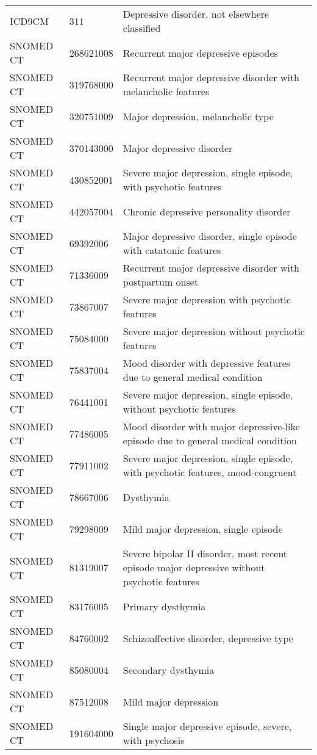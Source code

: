 \begin{longtable}{p{}p{}p{}}
  ICD9CM & 311 & Depressive disorder, not elsewhere classified \\ 
  SNOMED CT & 268621008 & Recurrent major depressive episodes \\ 
  SNOMED CT & 319768000 & Recurrent major depressive disorder with melancholic features \\ 
  SNOMED CT & 320751009 & Major depression, melancholic type \\ 
  SNOMED CT & 370143000 & Major depressive disorder \\ 
  SNOMED CT & 430852001 & Severe major depression, single episode, with psychotic features \\ 
  SNOMED CT & 442057004 & Chronic depressive personality disorder \\ 
  SNOMED CT & 69392006 & Major depressive disorder, single episode with catatonic features \\ 
  SNOMED CT & 71336009 & Recurrent major depressive disorder with postpartum onset \\ 
  SNOMED CT & 73867007 & Severe major depression with psychotic features \\ 
  SNOMED CT & 75084000 & Severe major depression without psychotic features \\ 
  SNOMED CT & 75837004 & Mood disorder with depressive features due to general medical condition \\ 
  SNOMED CT & 76441001 & Severe major depression, single episode, without psychotic features \\ 
  SNOMED CT & 77486005 & Mood disorder with major depressive-like episode due to general medical condition \\ 
  SNOMED CT & 77911002 & Severe major depression, single episode, with psychotic features, mood-congruent \\ 
  SNOMED CT & 78667006 & Dysthymia \\ 
  SNOMED CT & 79298009 & Mild major depression, single episode \\ 
  SNOMED CT & 81319007 & Severe bipolar II disorder, most recent episode major depressive without psychotic features \\ 
  SNOMED CT & 83176005 & Primary dysthymia \\ 
  SNOMED CT & 84760002 & Schizoaffective disorder, depressive type \\ 
  SNOMED CT & 85080004 & Secondary dysthymia \\ 
  SNOMED CT & 87512008 & Mild major depression \\ 
  SNOMED CT & 191604000 & Single major depressive episode, severe, with psychosis \\ 

\end{longtable}
